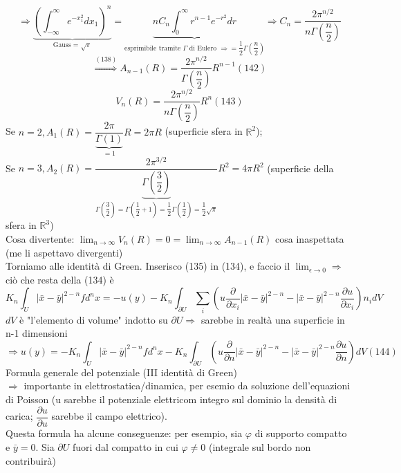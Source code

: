 \documentclass[a4paper,11pt]{report}
\newcommand{\R}{\mathbb{R}}
\newcommand{\x}{\bar{x}}
\newcommand{\y}{\bar{y}}
\begin{document}
$$
\Rightarrow \underset{\text{Gauss = $\sqrt{\pi}$}}{\underbrace{\left(\int_{-\infty}^{\infty}e^{-x_1^2}dx_1 \right)^n}}= \underset{\text{esprimibile tramite $\Gamma$ di Eulero $\Rightarrow = \dfrac{1}{2}\Gamma\left(\dfrac{n}{2}\right)$}}{\underbrace{n C_n\int_0^\infty r^{n-1}e^{-r^2}dr}} \Rightarrow C_n = \dfrac{2\pi^{n/2}}{n\Gamma\left(\dfrac{n}{2}\right)}
$$
\begin{equation}
\overset{(138)}{\Rightarrow}A_{n-1}(R) = \dfrac{2\pi^{n/2}}{\Gamma\left(\dfrac{n}{2}\right)}R^{n-1} (142)
\end{equation}
\begin{equation}
V_n(R)=\dfrac{2\pi^{n/2}}{n\Gamma\left(\dfrac{n}{2}\right)}R^n (143)
\end{equation}
Se $n=2, A_1(R)=\dfrac{2\pi}{\underset{=1}{\underbrace{\Gamma(1)}}} R=2\pi R$ (superficie sfera in $\R^2$);\\
Se $n=3, A_2(R)=\dfrac{2\pi^{3/2}}{\underset{\Gamma\left(\dfrac{3}{2}\right)=\Gamma\left(\dfrac{1}{2}+1\right)=\dfrac{1}{2}\Gamma\left(\dfrac{1}{2}\right)=\dfrac{1}{2}\sqrt{\pi}}{\underbrace{\Gamma\left(\dfrac{3}{2}\right)}}}R^2=4\pi R^2$ (superficie della sfera in $\R^3$)\\
Cosa divertente: $\lim_{n\to \infty} V_n(R)=0=\lim_{n\to \infty}A_{n-1}(R)$ cosa inaspettata (me li aspettavo divergenti)\\
Torniamo alle identità di Green. Inserisco (135) in (134), e faccio il $\lim_{\epsilon\to 0}\Rightarrow$ ciò che resta della (134) è 
$$
K_n\int_U |\x - \y|^{2-n}fd^nx=-u(y) - K_n\int_{\partial U}\sum_i \left(u\dfrac{\partial}{\partial x_i}|\x - \y|^{2-n} - |\x - \y|^{2-n} \dfrac{\partial u}{\partial x_i} \right)n_i dV
$$
$dV$ è "l'elemento di volume" indotto su $\partial U \Rightarrow$ sarebbe in realtà una superficie in n-1 dimensioni
\begin{equation}
\Rightarrow u(y)=-K_n\int_U |\x - \y|^{2-n}f d^n x - K_n\int_{\partial U} \left(u\dfrac{\partial}{\partial n}|\x - \y|^{2-n} - |\x - \y|^{2-n} \dfrac{\partial u}{\partial n} \right)dV (144)
\end{equation}
Formula generale del potenziale (III identità di Green)\\
$\Rightarrow$ importante in elettrostatica/dinamica, per esemio da soluzione dell'equazioni di Poisson (u sarebbe il potenziale elettricom integro sul dominio la densità di carica; $\dfrac{\partial u}{\partial u}$ sarebbe il campo elettrico).\\
Questa formula ha alcune conseguenze: per esempio, sia $\varphi$ di supporto compatto e $\y=0$. Sia $\partial U$ fuori dal compatto in cui $\varphi \neq 0$ (integrale sul bordo non contribuirà)\\
\end{document}
